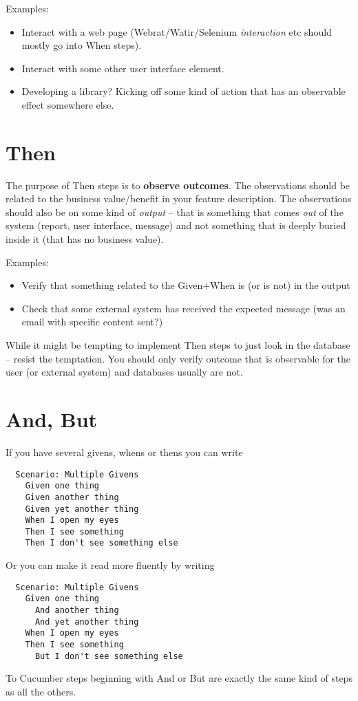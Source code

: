 Examples:

\begin{itemize}
  \item Interact with a web page (Webrat/Watir/Selenium \emph{interaction} etc should mostly go into When steps).
  \item Interact with some other user interface element.
  \item Developing a library? Kicking off some kind of action that has an observable effect somewhere else.
\end{itemize}

\section{Then}

The purpose of Then steps is to \textbf{observe outcomes}. The observations should be related to the business value/benefit in your feature description. The observations should also be on some kind of \emph{output} -- that is something that comes \emph{out} of the system (report, user interface, message) and not something that is deeply buried inside it (that has no business value).

Examples:

\begin{itemize}
  \item Verify that something related to the Given+When is (or is not) in the output
  \item Check that some external system has received the expected message (was an email with specific content sent?)
\end{itemize}

While it might be tempting to implement Then steps to just look in the database -- resist the temptation. You should only verify outcome that is observable for the user (or external system) and databases usually are not.

\section{And, But}

If you have several givens, whens or thens you can write

\begin{verbatim}
  Scenario: Multiple Givens
    Given one thing
    Given another thing
    Given yet another thing
    When I open my eyes
    Then I see something
    Then I don't see something else

\end{verbatim}
Or you can make it read more fluently by writing

\begin{verbatim}
  Scenario: Multiple Givens
    Given one thing
      And another thing
      And yet another thing
    When I open my eyes
    Then I see something
      But I don't see something else

\end{verbatim}
To Cucumber steps beginning with And or But are exactly the same kind of steps as all the others.
